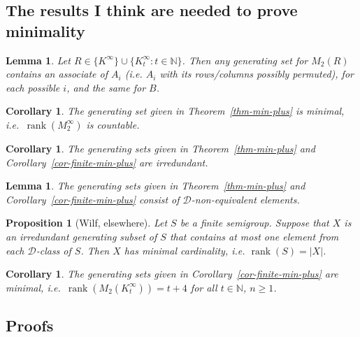 \documentclass{article}
\newcommand{\N}{\mathbb{N}}
\newcommand{\rank}{\operatorname{rank}}
\newcommand{\D}{\mathscr{D}}
\newcommand{\set}[2]{\{#1:#2\}}
\newtheorem{lem}[thm]{Lemma}
\newtheorem{cor}[thm]{Corollary}
\newtheorem{prop}[thm]{Proposition}
\theoremstyle{definition}
\begin{document}
\subsection*{The results I think are needed to prove minimality}

\begin{lem}\label{lem-all-contain}
  Let $R \in \{K^{\infty}\} \cup \set{K_{t}^{\infty}}{t \in \N}$.  Then
  any generating set for $M_{2}(R)$ contains an associate of $A_{i}$
  (i.e. $A_{i}$ with its rows/columns possibly permuted), for each possible $i$,
  and the same for $B$.
\end{lem}

\begin{cor}\label{cor-rank-infinite}
  The generating set given in Theorem~\ref{thm-min-plus} is minimal,
  i.e.\ $\rank(M_{2}^{\infty})$ is countable.
\end{cor}

\begin{cor}\label{cor-irredundant}
  The generating sets given in Theorem~\ref{thm-min-plus} and
  Corollary~\ref{cor-finite-min-plus} are irredundant.
\end{cor}

\begin{lem}\label{lem-non-D}
  The generating sets given in Theorem~\ref{thm-min-plus} and
  Corollary~\ref{cor-finite-min-plus} consist of $\D$-non-equivalent elements.
\end{lem}

\begin{prop}[Wilf, elsewhere]\label{prop-wilf}
  Let $S$ be a finite semigroup.  Suppose that $X$ is an irredundant generating
  subset of $S$ that contains at most one element from each $\D$-class of $S$.
  Then $X$ has minimal cardinality, i.e. $\rank(S) = |X|$.
\end{prop}

\begin{cor}\label{cor-rank-finite}
  The generating sets given in Corollary~\ref{cor-finite-min-plus} are minimal,
  i.e.\ $\rank\left(M_{2}(K_{t}^{\infty})\right) = t + 4$ for all $t \in \N$, $n
  \geq 1$.
\end{cor}

\subsection*{Proofs}
\end{document}
